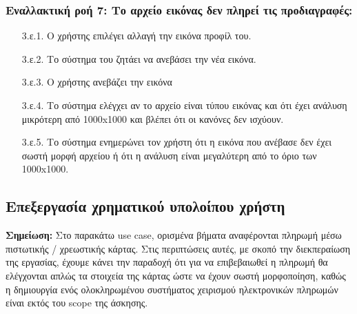 \documentclass[12pt,a4paper]{article}
\begin{document}
\subsubsection*{Εναλλακτική ροή 7: Το αρχείο εικόνας δεν πληρεί τις προδιαγραφές:}
\begin{enumerate}
    \item [3.ε.1.] Ο χρήστης επιλέγει αλλαγή την εικόνα προφίλ του.
    \item [3.ε.2.] Το σύστημα του ζητάει να ανεβάσει την νέα εικόνα.
    \item [3.ε.3.] Ο χρήστης ανεβάζει την εικόνα
    \item [3.ε.4.] Το σύστημα ελέγχει αν το αρχείο είναι τύπου εικόνας και ότι έχει ανάλυση μικρότερη από 1000x1000 και βλέπει ότι οι κανόνες δεν ισχύουν.
    \item [3.ε.5.] Το σύστημα ενημερώνει τον χρήστη ότι η εικόνα που ανέβασε δεν έχει σωστή μορφή αρχείου ή ότι η ανάλυση είναι μεγαλύτερη από το όριο των 1000x1000.
\end{enumerate}

\subsection{Επεξεργασία χρηματικού υπολοίπου χρήστη}

\textbf{Σημείωση: } Στο παρακάτω use case, ορισμένα βήματα αναφέρονται πληρωμή μέσω πιστωτικής / χρεωστικής κάρτας. Στις περιπτώσεις αυτές, με σκοπό την διεκπεραίωση της εργασίας, έχουμε κάνει την παραδοχή ότι για να επιβεβαιωθεί η πληρωμή θα ελέγχονται απλώς τα στοιχεία της κάρτας ώστε να έχουν σωστή μορφοποίηση, καθώς η δημιουργία ενός ολοκληρωμένου συστήματος χειρισμού ηλεκτρονικών πληρωμών είναι εκτός του scope της άσκησης.
\end{document}
